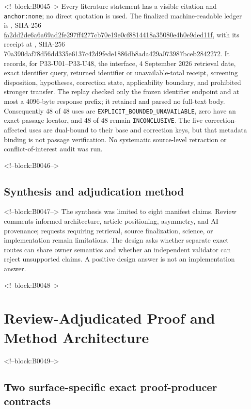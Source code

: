 \documentclass[11pt,a4paper]{article}
\begin{document}
<!--block:B0045-->
Every literature statement has a visible citation and \texttt{anchor:none}; no direct quotation is used. The finalized machine-readable ledger is , SHA-256 \url{fa2dd2de6a6a69ad2fe297ff4277cb70e19e0cf8814418a35080e4b0e9ded11f}, with its receipt at , SHA-256 \url{70a390daf78d56dd335e6137c42d9fede1886db8ada429a073987bceb2842272}. It records, for P33-U01--P33-U48, the interface, 4 September 2026 retrieval date, exact identifier query, returned identifier or unavailable-total receipt, screening disposition, hypotheses, correction state, applicability boundary, and prohibited stronger transfer. The replay checked only the frozen identifier endpoint and at most a 4096-byte response prefix; it retained and parsed no full-text body. Consequently 48 of 48 uses are \texttt{EXPLICIT\_BOUNDED\_UNAVAILABLE}, zero have an exact passage locator, and 48 of 48 remain \texttt{INCONCLUSIVE}. The five correction-affected uses are dual-bound to their base and correction keys, but that metadata binding is not passage verification. No systematic source-level retraction or conflict-of-interest audit was run.

<!--block:B0046-->
\hypertarget{synthesis-and-adjudication-method}{%
\subsection{Synthesis and adjudication method}\label{synthesis-and-adjudication-method}}

<!--block:B0047-->
The synthesis was limited to eight manifest claims. Review comments informed architecture, article positioning, asymmetry, and AI provenance; requests requiring retrieval, source finalization, science, or implementation remain limitations. The design asks whether separate exact routes can share owner semantics and whether an independent validator can reject unsupported claims. A positive design answer is not an implementation answer.

<!--block:B0048-->
\hypertarget{review-adjudicated-proof-and-method-architecture}{%
\section{Review-Adjudicated Proof and Method Architecture}\label{review-adjudicated-proof-and-method-architecture}}

<!--block:B0049-->
\hypertarget{two-surface-specific-exact-proof-producer-contracts}{%
\subsection{Two surface-specific exact proof-producer contracts}\label{two-surface-specific-exact-proof-producer-contracts}}
\end{document}
